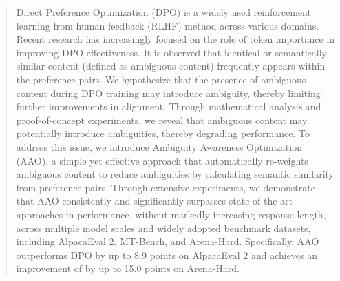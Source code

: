 \begin{abstract}
Direct Preference Optimization (DPO) is a widely used reinforcement learning from human feedback (RLHF) method across various domains. Recent research has increasingly focused on the role of token importance in improving DPO effectiveness. It is observed that identical or semantically similar content (defined as ambiguous content) frequently appears within the preference pairs. We hypothesize that the presence of ambiguous content during DPO training may introduce ambiguity, thereby limiting further improvements in alignment. Through mathematical analysis and proof-of-concept experiments, we reveal that ambiguous content may potentially introduce ambiguities, thereby degrading performance. To address this issue, we introduce Ambiguity Awareness Optimization (AAO), a simple yet effective approach that automatically re-weights ambiguous content to reduce ambiguities by calculating semantic similarity from preference pairs. Through extensive experiments, we demonstrate that AAO consistently and significantly surpasses state-of-the-art approaches in performance, without markedly increasing response length, across multiple model scales and widely adopted benchmark datasets, including AlpacaEval 2, MT-Bench, and Arena-Hard. Specifically, AAO outperforms DPO by up to 8.9 points on AlpacaEval 2 and achieves an improvement of by up to 15.0 points on Arena-Hard. 
\end{abstract}